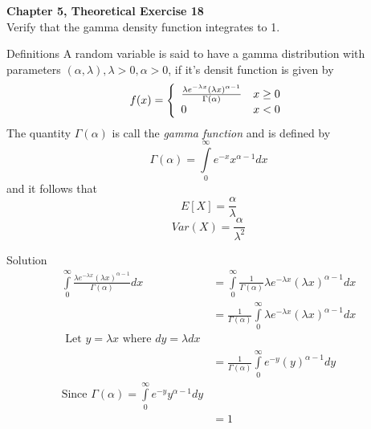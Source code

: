 \documentclass{article}
\begin{document}
\begin{spacing}{1.1}
\maketitle

\newpage
\begin{homeworkProblem}
  {\bf Chapter 5, Theoretical Exercise 18}\\
  Verify that the gamma density function integrates to 1.
  
  \begin{homeworkSection}{Definitions}
    A random variable is said to have a gamma distribution with parameters
    $(\alpha, \lambda), \lambda > 0, \alpha > 0$, if it's densit function
    is given by
    \[
      f( x) = \left\{
        \begin{array}{l l}
        \frac{ \lambda e^{-\lambda x} (\lambda x)^{\alpha - 1}}
             { \Gamma( \alpha)} &x \ge 0\\
        0 &x < 0 
        \end{array} \right.
    \]
    The quantity $\Gamma( \alpha)$ is call the \emph{gamma function}
    and is defined by
      \[\Gamma( \alpha) = \int\limits_0^\infty e^{-x} x^{\alpha - 1} dx\]
    and it follows that
      \[E[ X] = \frac{ \alpha}{ \lambda}\]
      \[Var(X) = \frac{ \alpha}{ \lambda^2}\]
  \end{homeworkSection}
  \begin{homeworkSection}{Solution}
    \begin{align*}
      \int\limits_0^\infty \frac{ \lambda e^{-\lambda x} (\lambda x)^{\alpha - 1}}
        { \Gamma( \alpha)} dx 
      &= \int\limits_0^\infty \frac{ 1}{ \Gamma( \alpha)}
        \lambda e^{-\lambda x} (\lambda x)^{\alpha - 1} dx\\
      &= \frac{ 1}{ \Gamma( \alpha)} \int\limits_0^\infty
        \lambda e^{-\lambda x} (\lambda x)^{\alpha - 1} dx\\
      \text{ Let $y = \lambda x$ where $dy = \lambda dx$}\\
      &= \frac{ 1}{ \Gamma( \alpha)} \int\limits_0^\infty
        e^{-y} (y)^{\alpha - 1} dy\\
      \text{Since $\Gamma( \alpha) = \int\limits_0^\infty e^{-y} y^{\alpha - 1} dy$}\\
      &= 1
    \end{align*}
  \end{homeworkSection}
\end{homeworkProblem}


\end{spacing}
\end{document}

